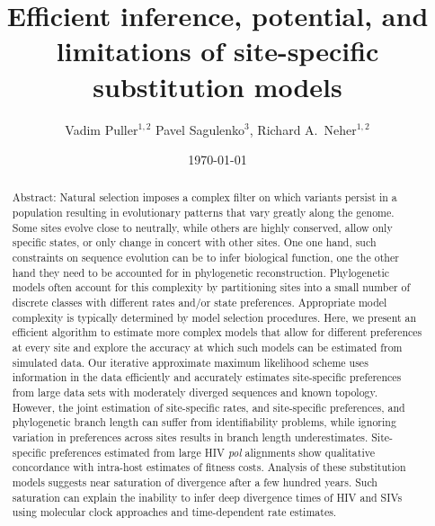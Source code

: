 \documentclass[aps,rmp,twocolumn,linenumbers]{revtex4-1}
\begin{document}
\title{Efficient inference, potential, and limitations of site-specific substitution models}
\author{Vadim Puller$^{1,2}$ Pavel Sagulenko$^{3}$, Richard A.~Neher$^{1,2}$}

\date{\today}

\begin{abstract}
Abstract: Natural selection imposes a complex filter on which variants persist in a population resulting in evolutionary patterns that vary greatly along the genome.
Some sites evolve close to neutrally, while others are highly conserved, allow only specific states, or only change in concert with other sites.
One one hand, such constraints on sequence evolution can be to infer biological function, one the other hand they need to be accounted for in phylogenetic reconstruction.
Phylogenetic models often account for this complexity by partitioning sites into a small number of discrete classes with different rates and/or state preferences.
Appropriate model complexity is typically determined by model selection procedures.
Here, we present an efficient algorithm to estimate more complex models that allow for different preferences at every site and explore the accuracy at which such models can be estimated from simulated data.
Our iterative approximate maximum likelihood scheme uses information in the data efficiently and accurately estimates site-specific preferences from large data sets with moderately diverged sequences and known topology.
However, the joint estimation of site-specific rates, and site-specific preferences, and phylogenetic branch length can suffer from identifiability problems, while ignoring variation in preferences across sites results in branch length underestimates.
Site-specific preferences estimated from large HIV \emph{pol} alignments show qualitative concordance with intra-host estimates of fitness costs.
Analysis of these substitution models suggests near saturation of divergence after a few hundred years.
Such saturation can explain the inability to infer deep divergence times of HIV and SIVs using molecular clock approaches and time-dependent rate estimates.
\end{abstract}

\maketitle
\end{document}
